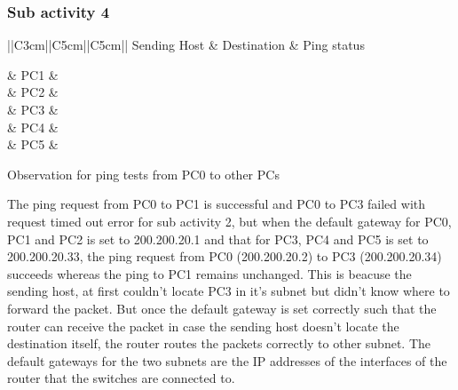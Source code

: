 \documentclass{lab_sheet}
\newcommand{\ping}[1]{
    \begin{tabular}{||C{3cm}||C{5cm}||C{5cm}||}
        \toprule
          Sending Host & Destination & Ping status\\
          \hline
          #1
          \bottomrule
       \end{tabular}
}
\begin{document}
    \subsubsection*{Sub activity 4}
    \begin{table}[H]
      \centering
      \ping{
         & PC1 & \multirow{5}{*}{Successful}\\
        & PC2 &\\
        & PC3 &\\
        & PC4 &\\
        & PC5 &\\
      }
  \caption{Observation for ping tests from PC0 to other PCs}
  \label{tbl:activityb2}
  \end{table}
  The ping request from PC0 to PC1 is successful and PC0 to PC3 failed with request timed out error for sub activity 2, but when the default gateway for PC0, PC1 and PC2 is set to 200.200.20.1 and that for PC3, PC4 and PC5 is set to 200.200.20.33, the ping request from PC0 (200.200.20.2) to PC3 (200.200.20.34) succeeds whereas the ping to PC1 remains unchanged. This is beacuse the sending host, at first couldn't locate PC3 in it's subnet but didn't know where to forward the packet. But once the default gateway is set correctly such that the router can receive the packet in case the sending host doesn't locate the destination itself, the router routes the packets correctly to other subnet. The default gateways for the two subnets are the IP addresses of the interfaces of the router that the switches are connected to. \pagebreak

\end{document}
